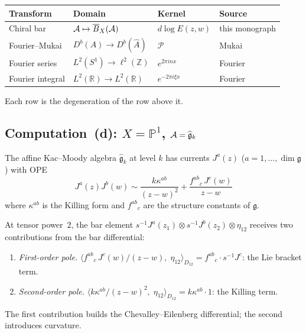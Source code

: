 \begin{remark}\label{rem:four-transforms}
\begin{center}
\small
\renewcommand{\arraystretch}{1.3}
\begin{tabular}{llll}
\textbf{Transform}
  & \textbf{Domain}
  & \textbf{Kernel}
  & \textbf{Source} \\
\hline
Chiral bar
  & $\mathcal{A} \mapsto \overline{B}_X(\mathcal{A})$
  & $d\log E(z,w)$
  & this monograph \\
Fourier--Mukai
  & $D^b(A) \to D^b(\hat{A})$
  & $\mathcal{P}$
  & Mukai~\cite{Muk81} \\
Fourier series
  & $L^2(S^1) \to \ell^2(\mathbb{Z})$
  & $e^{2\pi inx}$
  & Fourier \\
Fourier integral
  & $L^2(\mathbb{R}) \to L^2(\mathbb{R})$
  & $e^{-2\pi i\xi x}$
  & Fourier
\end{tabular}
\end{center}
Each row is the degeneration of the row above it.
\end{remark}

\subsection*{Computation~(d): $X = \mathbb{P}^1$,
  $\mathcal{A} = \widehat{\mathfrak{g}}_k$}

The affine Kac--Moody algebra $\widehat{\mathfrak{g}}_k$ at
level $k$ has currents $J^a(z)$ ($a = 1, \ldots, \dim\mathfrak{g}$)
with OPE
\begin{equation}\label{eq:fourier-km-ope}
J^a(z)J^b(w) \sim \frac{k\kappa^{ab}}{(z-w)^2}
+ \frac{f^{ab}{}_c\,J^c(w)}{z-w}
\end{equation}
where $\kappa^{ab}$ is the Killing form and $f^{ab}{}_c$ are the
structure constants of $\mathfrak{g}$.

\begin{computation}
\label{comp:fourier-km-bar}
At tensor power~$2$, the bar element
$s^{-1}J^a(z_1) \otimes s^{-1}J^b(z_2) \otimes \eta_{12}$ receives
two contributions from the bar differential:
\begin{enumerate}
\item \emph{First-order pole.}
  $\bigl\langle f^{ab}{}_c\, J^c(w)/(z-w),\;
  \eta_{12}\bigr\rangle_{D_{12}}
  = f^{ab}{}_c \cdot s^{-1}J^c$:
  the Lie bracket term.
\item \emph{Second-order pole.}
  $\bigl\langle k\kappa^{ab}/(z-w)^2,\;
  \eta_{12}\bigr\rangle_{D_{12}}
  = k\kappa^{ab} \cdot 1$:
  the Killing term.
\end{enumerate}
The first contribution builds the Chevalley--Eilenberg differential;
the second introduces curvature.
\end{computation}

